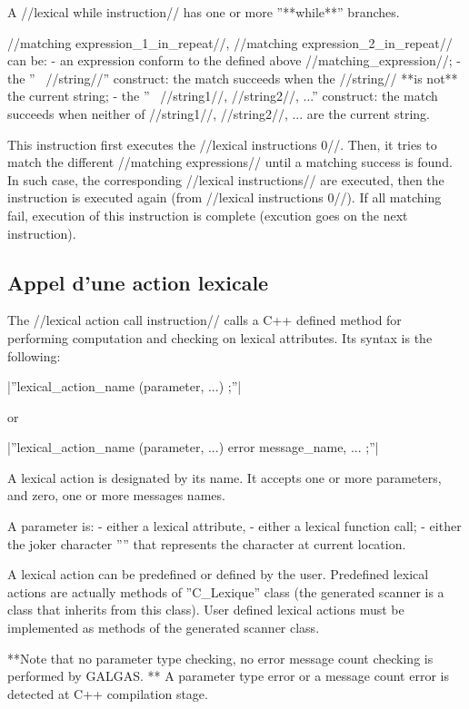 {A //lexical while instruction// has one or more ''**while**'' branches.

//matching expression\_1\_in\_repeat//, //matching expression\_2\_in\_repeat// can be:
  - an expression conform to the defined above //matching\_expression//;
  - the ''~ //string//'' construct: the match succeeds when the //string// **is not** the current string;
  - the ''~ //string1//, //string2//, ...'' construct: the match succeeds when neither of //string1//, //string2//, ... are the current string.

This instruction first executes the //lexical instructions 0//. Then, it tries to match the different //matching expressions// until a matching success is found. In such case, the corresponding //lexical instructions// are executed, then the instruction is executed again (from //lexical instructions 0//). If all matching fail, execution of this instruction is complete (excution goes on the next instruction).

\subsection{Appel d'une action lexicale}

The //lexical action call instruction// calls a C++ defined method for performing computation and checking on lexical attributes. Its syntax is the following:

|''lexical\_action\_name (parameter, ...) ;''|

or

|''lexical\_action\_name (parameter, ...) error message\_name, ... ;''|

A lexical action is designated by its name. It accepts one or more parameters, and zero, one or more messages names.

A parameter is:
  - either a lexical attribute,
  - either a lexical function call;
  - either the joker character ''\textquotesingle*\textquotesingle'' that represents the character at current location.

A lexical action can be predefined or defined by the user. Predefined lexical actions are actually methods of ''C\_Lexique'' class (the generated scanner is a class that inherits from this class). User defined lexical actions must be implemented as methods of the generated scanner class.

**Note that no parameter type checking, no error message count checking is performed by GALGAS. ** A parameter type error or a message count error is detected at C++ compilation stage.
 
}
